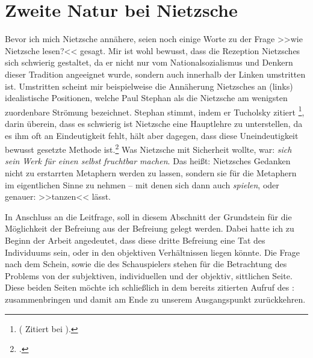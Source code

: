 \documentclass[12pt, a4paper, openany]{report}
\begin{document}
\section{Zweite Natur bei Nietzsche}\label{abschnitt_2}
Bevor ich mich Nietzsche annähere, seien noch einige Worte zu der Frage >>wie Nietzsche lesen?<< gesagt.
Mir ist wohl bewusst, dass die Rezeption Nietzsches sich schwierig gestaltet, da er nicht nur vom Nationalsozialismus und Denkern dieser Tradition angeeignet wurde, sondern auch innerhalb der Linken umstritten ist.
Umstritten scheint mir beispielweise die Annäherung Nietzsches an (links) idealistische Positionen, welche Paul Stephan als die Nietzsche am wenigsten zuordenbare Strömung bezeichnet.
Stephan stimmt, indem er Tucholsky zitiert%
 \footnote{
     ( Zitiert bei \cite[][17]{stephan_nietzscheanismus_2019}).
},
darin überein, dass es schwierig ist Nietzsche eine Hauptlehre zu unterstellen, da es ihm oft an Eindeutigkeit fehlt, hält aber dagegen, dass diese Uneindeutigkeit bewusst gesetzte Methode ist.\footcite[Vgl.][18]{stephan_nietzscheanismus_2019}
Was Nietzsche mit Sicherheit wollte, war: \emph{sich sein Werk für einen selbst fruchtbar machen}. 
Das heißt: Nietzsches Gedanken nicht zu erstarrten Metaphern werden zu lassen, sondern sie für die Metaphern im eigentlichen Sinne zu nehmen -- mit denen sich dann auch \emph{spielen}, oder genauer: >>tanzen<< lässt.

In Anschluss an die Leitfrage, soll in diesem Abschnitt der Grundstein für die Möglichkeit der Befreiung aus der Befreiung gelegt werden.
Dabei hatte ich zu Beginn der Arbeit angedeutet, dass diese dritte Befreiung eine Tat des Individuums sein, oder in den objektiven Verhältnissen liegen könnte. 
Die Frage nach dem Schein, sowie die des Schauspielers stehen für die Betrachtung des Problems von der subjektiven, individuellen und der objektiv, sittlichen Seite. 
Diese beiden Seiten möchte ich schließlich in dem bereits zitierten Aufruf des :  zusammenbringen und damit am Ende zu unserem Ausgangspunkt zurückkehren. 
\end{document}
